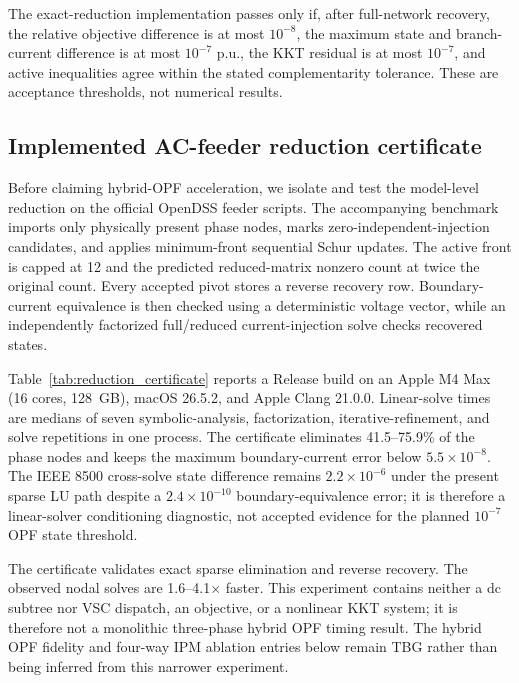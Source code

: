 \documentclass[journal,10pt]{IEEEtran}
\begin{document}
The exact-reduction implementation passes only if, after full-network recovery,
the relative objective difference is at most $10^{-8}$, the maximum state and
branch-current difference is at most $10^{-7}$ p.u., the KKT residual is at most
$10^{-7}$, and active inequalities agree within the stated complementarity
tolerance.  These are acceptance thresholds, not numerical results.

\subsection{Implemented AC-feeder reduction certificate}
Before claiming hybrid-OPF acceleration, we isolate and test the model-level
reduction on the official OpenDSS feeder scripts.  The accompanying benchmark
imports only physically present phase nodes, marks zero-independent-injection
candidates, and applies
minimum-front sequential Schur updates.  The active front is capped at 12 and
the predicted reduced-matrix nonzero count at twice the original count.  Every
accepted pivot stores a reverse recovery row.  Boundary-current equivalence is
then checked using a deterministic voltage vector, while an independently
factorized full/reduced current-injection solve checks recovered states.

Table~\ref{tab:reduction_certificate} reports a Release build on an Apple M4 Max
(16 cores, 128~GB), macOS 26.5.2, and Apple Clang 21.0.0.  Linear-solve times are
medians of seven symbolic-analysis, factorization, iterative-refinement, and
solve repetitions in one process.  The certificate eliminates 41.5--75.9\% of
the phase nodes and keeps the maximum boundary-current error below
$5.5\times10^{-8}$.  The IEEE 8500 cross-solve state difference remains
$2.2\times10^{-6}$ under the present sparse LU path despite a
$2.4\times10^{-10}$ boundary-equivalence error; it is therefore a linear-solver
conditioning diagnostic, not accepted evidence for the planned $10^{-7}$ OPF
state threshold.



The certificate validates exact sparse elimination and reverse recovery.  The
observed nodal solves are 1.6--4.1$\times$ faster.  This experiment contains
neither a dc subtree nor VSC dispatch, an objective, or a nonlinear KKT system;
it is therefore not a monolithic three-phase hybrid OPF timing result.  The
hybrid OPF fidelity and four-way IPM ablation entries below remain TBG rather
than being inferred from this narrower experiment.
\end{document}
